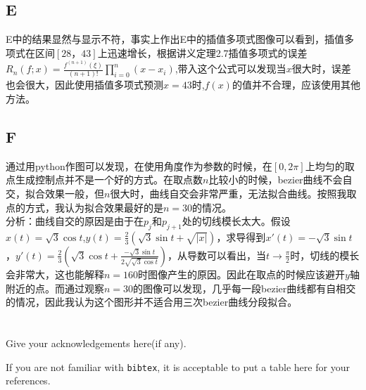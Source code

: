 \documentclass[a4paper]{article}
\begin{document}
\subsection*{E}
E中的结果显然与显示不符，事实上作出E中的插值多项式图像可以看到，插值多项式在区间$[28，43]$上迅速增长，根据讲义定理2.7插值多项式的误差$R_n(f;x)=\frac{f^{(n+1)}(\xi)}{(n+1)!}\prod_{i=0}^{n}(x-x_i) $,带入这个公式可以发现当$x$很大时，误差也会很大，因此使用插值多项式预测$x=43$时,$f(x)$的值并不合理，应该使用其他方法。

\subsection*{F}
通过用python作图可以发现，在使用角度作为参数的时候，在$[0,2\pi]$上均匀的取点生成控制点并不是一个好的方式。在取点数$n$比较小的时候，bezier曲线不会自交，拟合效果一般，但$n$很大时，曲线自交会非常严重，无法拟合曲线。按照我取点的方式，我认为拟合效果最好的是$n=30$的情况。\\
分析：曲线自交的原因是由于在$p_j$和$p_{j+1}$处的切线模长太大。假设$x(t)=\sqrt{3}\cos t$,$y(t)=\frac{2}{3}(\sqrt{3}\sin t +\sqrt{|x|})$，求导得到${x}'(t)=-\sqrt{3}\sin t$，${y}'(t)=\frac{2}{3}(\sqrt{3}\cos t+\frac{-\sqrt{3}\sin t}{2\sqrt{\sqrt{3} \cos t}})$，从导数可以看出，当$t \to \frac{\pi}{2}$时，切线的模长会非常大，这也能解释$n=160$时图像产生的原因。因此在取点的时候应该避开$y$轴附近的点。而通过观察$n=30$的图像可以发现，几乎每一段bezier曲线都有自相交的情况，因此我认为这个图形并不适合用三次bezier曲线分段拟合。
\section*{  }
Give your acknowledgements here(if any).


\printbibliography

If you are not familiar with \texttt{bibtex}, 
it is acceptable to put a table here for your references.
\end{document}
